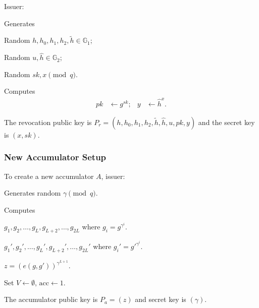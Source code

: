Issuer:
\begin{legal}
    \item Generates
    \begin{legal}
        \item Random $h,h_0,h_1,h_2,\widetilde{h}\in \mathbb{G}_1$;
        \item Random $u,\widehat{h}\in \mathbb{G}_2$;
        \item Random $sk,x \pmod{q}$.
    \end{legal}
    \item Computes 
\begin{align*}
    pk&\leftarrow g^{sk}; & y&\leftarrow \widehat{h}^x.
\end{align*}
\end{legal}

The revocation public key is
$P_r = (h,h_0,h_1,h_2,\widetilde{h},\widehat{h},u,pk,y)$ and the secret key is $(x,sk)$.
\subsubsection{New Accumulator Setup}
To create a new accumulator $A$, issuer:
\begin{legal}
\item Generates random $\gamma\pmod{q}$.
\item Computes
\begin{legal}
    \item $g_1,g_2,\ldots,g_L,g_{L+2},\ldots,g_{2L}$ where
$g_i = g^{\gamma^i}$. 
    \item $g_1',g_2',\ldots,g_L',g_{L+2}',\ldots,g_{2L}'$ where
$g_i' = g'^{\gamma^i}$. 
    \item $z = (e(g,g'))^{\gamma^{L+1}}$.
\end{legal}
\item Set $V \leftarrow\emptyset$, $\mathrm{acc}\leftarrow 1$.
\end{legal}
The accumulator public key is $P_a = (z)$ and secret key is $(\gamma)$.

